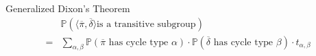 \documentclass[hyphens,aspectratio=169]{beamer}
\begin{document}
\begin{frame}{Generalized Dixon's Theorem}
\begin{align*}
  & \mathbb{P}(\langle \overline\pi,\overline\delta \rangle\text{
  is a transitive subgroup})
  \\= &\sum_{\alpha, \beta}\mathbb{P}(\overline\pi\text{ has cycle
  type }\alpha)\cdot\mathbb{P}(\overline\delta\text{ has cycle type
  }\beta)\cdot t_{\alpha, \beta}
\end{align*}
\end{frame}

\end{document}
